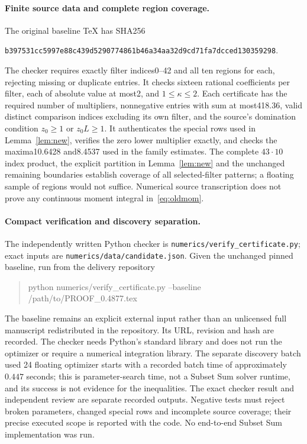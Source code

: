 \paragraph{Finite source data and complete region coverage.}
The original baseline TeX has SHA256
\begin{center}\scriptsize
\texttt{b397531cc5997e88c439d5290774861b46a34aa32d9cd71fa7dcced130359298}.
\end{center}
The checker requires exactly filter indices0--42 and all ten regions for
each, rejecting missing or duplicate entries. It checks sixteen rational
coefficients per filter, each of absolute value at most2, and
$1\le\kappa\le2$. Each certificate has the required number of multipliers,
nonnegative entries with sum at most418.36, valid distinct comparison
indices excluding its own filter, and the source's domination condition
$z_0\ge1$ or $z_0L\ge1$. It authenticates the special rows used in
Lemma~\ref{lem:new}, verifies the zero lower multiplier exactly, and
checks the maxima10.6428 and8.4537 used in the family estimates.
The complete $43\cdot10$ index product, the explicit partition in
Lemma~\ref{lem:new} and the unchanged remaining boundaries establish
coverage of all selected-filter patterns; a floating sample of regions
would not suffice. Numerical source transcription does not prove any
continuous moment integral in~\eqref{eq:oldmom}.

\paragraph{Compact verification and discovery separation.}
The independently written Python checker is
\texttt{numerics/verify\_certificate.py}; exact inputs are
\texttt{numerics/data/candidate.json}. Given the unchanged pinned
baseline, run from the delivery repository
\begin{quote}\small\ttfamily
python numerics/verify\_certificate.py --baseline /path/to/PROOF\_0.4877.tex
\end{quote}
The baseline remains an explicit external input rather than an unlicensed
full manuscript redistributed in the repository. Its URL, revision and
hash are recorded. The checker needs Python's standard library and does
not run the optimizer or require a numerical integration library.
The separate discovery batch used 24 floating optimizer starts with a
recorded batch time of approximately $0.447$ seconds; this is parameter-search
time, not a Subset Sum solver runtime, and its success is not evidence for
the inequalities.
The exact checker result and independent review are separate recorded
outputs. Negative tests must reject broken parameters, changed special
rows and incomplete source coverage; their precise executed scope is
reported with the code. No end-to-end Subset Sum implementation was run.
